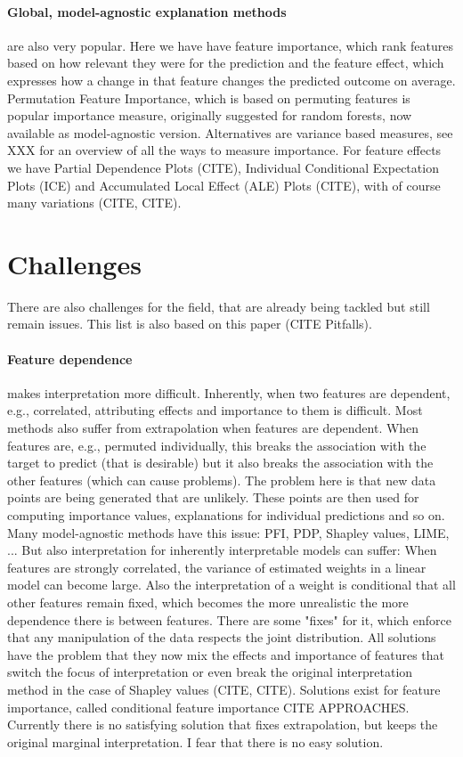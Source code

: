 \documentclass[runningheads]{llncs}
\begin{document}
\paragraph{Global, model-agnostic explanation methods} are also very popular.
Here we have have feature importance, which rank features based on how relevant they were for the prediction and the feature effect, which expresses how a change in that feature changes the predicted outcome on average.
Permutation Feature Importance, which is based on permuting features is popular importance measure, originally suggested for random forests, now available as model-agnostic version.
Alternatives are variance based measures, see XXX for an overview of all the ways to measure importance.
For feature effects we have Partial Dependence Plots (CITE), Individual Conditional Expectation Plots (ICE) and Accumulated Local Effect (ALE) Plots (CITE), with of course many variations (CITE, CITE).


\section{Challenges}

There are also challenges for the field, that are already being tackled but still remain issues.
This list is also based on this paper (CITE Pitfalls).

\paragraph{Feature dependence} makes interpretation more difficult.
Inherently, when two features are dependent, e.g., correlated, attributing effects and importance to them is difficult.
Most methods also suffer from extrapolation when features are dependent.
When features are, e.g., permuted individually, this breaks the association with the target to predict (that is desirable) but it also breaks the association with the other features (which can cause problems).
The problem here is that new data points are being generated that are unlikely.
These points are then used for computing importance values, explanations for individual predictions and so on.
Many model-agnostic methods have this issue: PFI, PDP, Shapley values, LIME, ...
But also interpretation for inherently interpretable models can suffer:
When features are strongly correlated, the variance of estimated weights in a linear model can become large.
Also the interpretation of a weight is conditional that all other features remain fixed, which becomes the more unrealistic the more dependence there is between features.
There are some "fixes" for it, which enforce that any manipulation of the data respects the joint distribution.
All solutions have the problem that they now mix the effects and importance of features that switch the focus of interpretation or even break the original interpretation method in the case of Shapley values (CITE, CITE).
Solutions exist for feature importance, called conditional feature importance CITE APPROACHES.
Currently there is no satisfying solution that fixes extrapolation, but keeps the original marginal interpretation.
I fear that there is no easy solution.
\end{document}
